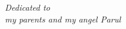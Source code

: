 
\begin{center}
\doublespacing
\vspace*{\fill}
{\Large{\textit{Dedicated to}\\\textit{my parents and my angel Parul}}}
\vspace*{\fill}
\end{center}


